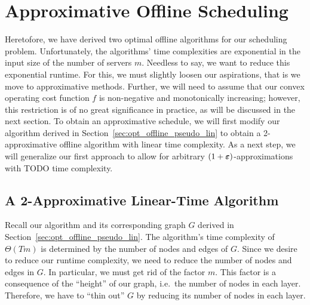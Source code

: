 
\chapter{Approximative Offline Scheduling}\label{chap:approx_offline_scheduling}
Heretofore, we have derived two optimal offline algorithms for our scheduling problem. Unfortunately, the algorithms' time complexities are exponential in the input size of the number of servers $m$. Needless to say, we want to reduce this exponential runtime. For this, we must slightly loosen our aspirations, that is we move to approximative methods. Further, we will need to assume that our convex operating cost function $f$ is non-negative and monotonically increasing; however, this restriction is of no great significance in practice, as will be discussed in the next section.
To obtain an approximative schedule, we will first modify our algorithm derived in Section~\ref{sec:opt_offline_pseudo_lin} to obtain a 2-approximative offline algorithm with linear time complexity. As a next step, we will generalize our first approach to allow for arbitrary $(1+\boldsymbol\varepsilon)$-approximations with TODO time complexity.

\section{A 2-Approximative Linear-Time Algorithm}
Recall our algorithm and its corresponding graph $G$ derived in Section~\ref{sec:opt_offline_pseudo_lin}. The algorithm's time complexity of $\Theta(Tm)$ is determined by the number of nodes and edges of $G$. Since we desire to reduce our runtime complexity, we need to reduce the number of nodes and edges in $G$. In particular, we must get rid of the factor $m$. This factor is a consequence of the ``height'' of our graph, i.e.\ the number of nodes in each layer. Therefore, we have to ``thin out'' $G$ by reducing its number of nodes in each layer.

